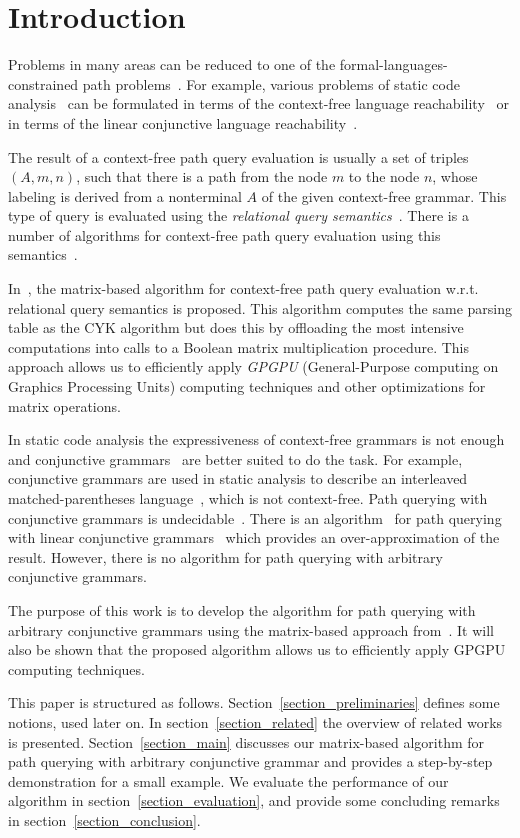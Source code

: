 \section{Introduction}

Problems in many areas can be reduced to one of the formal-languages-constrained path problems~\cite{barrett2000formal}. For example, various problems of static code analysis~\cite{bastani2015specification,xu2009scaling} can be formulated in terms of the context-free language reachability~\cite{reps1998program} or in terms of the linear conjunctive language reachability~\cite{zhang2017context}.

The result of a context-free path query evaluation is usually a set of triples \mbox{$(A, m, n)$}, such that there is a path from the node $m$ to the node $n$, whose labeling is derived from a nonterminal $A$ of the given context-free grammar. This type of query is evaluated using the \emph{relational query semantics}~\cite{hellingsRelational}. There is a number of algorithms for context-free path query evaluation using this semantics~\cite{azimov2018context,GLL,hellingsRelational,GraphQueryWithEarley,RDF}.

In~\cite{azimov2018context}, the matrix-based algorithm for context-free path query evaluation w.r.t. relational query semantics is proposed. This algorithm computes the same parsing table as the CYK algorithm but does this by offloading the most intensive computations into calls to a Boolean matrix multiplication procedure. This approach allows us to efficiently apply \emph{GPGPU} (General-Purpose computing on Graphics Processing Units) computing techniques and other optimizations for matrix operations.

In static code analysis the expressiveness of context-free grammars is not enough and conjunctive grammars~\cite{okhotinConjAndBool} are better suited to do the task. For example, conjunctive grammars are used in static analysis to describe an interleaved matched-parentheses language~\cite{zhang2017context}, which is not context-free. Path querying with conjunctive grammars is undecidable~\cite{hellingsRelational}. There is an algorithm~\cite{zhang2017context} for path querying with linear conjunctive grammars~\cite{okhotinConjAndBool} which provides an over-approximation of the result. However, there is no algorithm for path querying with arbitrary conjunctive grammars.

The purpose of this work is to develop the algorithm
for path querying with arbitrary conjunctive grammars using the matrix-based approach from~\cite{azimov2018context}. It will also be shown that the proposed algorithm allows us to efficiently apply GPGPU computing techniques.

This paper is structured as follows. Section~\ref{section_preliminaries} defines some notions, used later on. In section~\ref{section_related} the overview of related works is presented. Section~\ref{section_main} discusses our matrix-based algorithm for path querying with arbitrary conjunctive grammar and provides a step-by-step demonstration for a small example. We evaluate the performance of our algorithm in section~\ref{section_evaluation}, and provide some concluding remarks in section~\ref{section_conclusion}.
